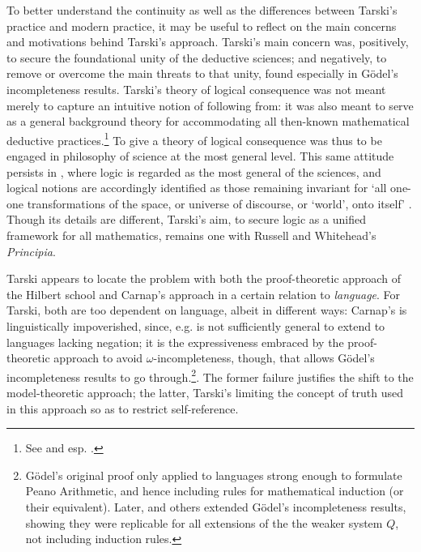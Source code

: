 \documentclass[]{article}
\begin{document}
To better understand the continuity as well as the differences between Tarski's practice and modern practice, it may be useful to reflect on the main concerns and motivations behind Tarski's approach. Tarski's main concern was, positively, to secure the foundational unity of the deductive sciences; and negatively, to remove or overcome the main threats to that unity, found especially in G\"{o}del's incompleteness results. Tarski's theory of logical consequence was not meant merely to capture an intuitive notion of following from: it was also meant to serve as a general background theory for accommodating all then-known mathematical deductive practices.\footnote{See \cite{Blok1988} and esp. \cite{Jane2006}.} To give a theory of logical consequence was thus to be engaged in philosophy of science at the most general level. This same attitude persists in \cite{Tarski1986}, where logic is regarded as the most general of the sciences, and logical notions are accordingly identified as those remaining invariant for `all one-one transformations of the space, or universe of discourse, or `world', onto itself' \cite[49]{Tarski1986}. Though its details are different, Tarski's aim, to secure logic as a unified framework for all mathematics, remains one with Russell and Whitehead's \textit{Principia}.

Tarski appears to locate the problem with both the proof-theoretic approach of the Hilbert school and Carnap's approach in a certain relation to \textit{language}. For Tarski, both are too dependent on language, albeit in different ways: Carnap's is linguistically impoverished, since, e.g. is not sufficiently general to extend to languages lacking negation; it is the expressiveness embraced by the proof-theoretic approach to avoid $\omega$-incompleteness, though, that allows G\"{o}del's incompleteness results to go through.\footnote{G\"{o}del's original proof only applied to languages strong enough to formulate Peano Arithmetic, and hence including rules for mathematical induction (or their equivalent). Later, \cite{Rosser1936} and others extended G\"{o}del's incompleteness results, showing they were replicable for all extensions of the the weaker system $Q$, not including induction rules.}. The former failure justifies the shift to the model-theoretic approach; the latter, Tarski's limiting the concept of truth used in this approach so as to restrict self-reference.
\end{document}
